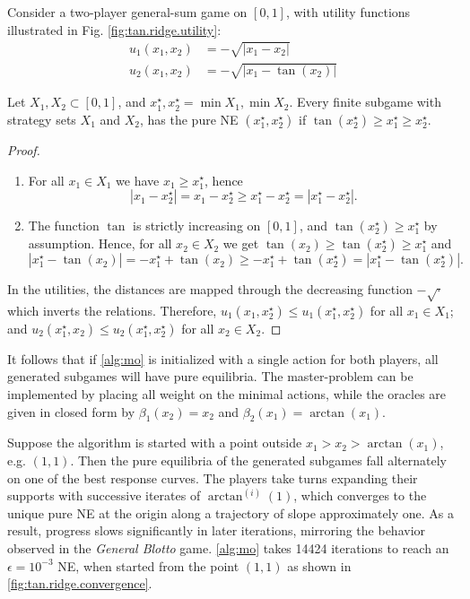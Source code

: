 


\begin{example}\label{ex.tan.ridge}
Consider a two-player general-sum game on $[0,1]$, with utility functions illustrated in Fig. \ref{fig:tan.ridge.utility}:
\[\begin{aligned}
u_1(x_1,x_2)&=-\sqrt{|x_1-x_2|} \\
u_2(x_1,x_2)&=-\sqrt{|x_1-\tan(x_2)|}
\end{aligned}\]

Let $X_1,X_2\subset[0,1]$, and $x^\star_1,x^\star_2 = \min X_1, \min X_2$. Every finite subgame with strategy sets $X_1$ and $X_2$, has the pure NE $(x^\star_1, x^\star_2)$ if $\tan(x^\star_2) \ge  x^\star_1 \ge x^\star_2$.
\begin{proof}
\begin{enumerate}
    \item For all $x_1\in X_1$ we have $x_1\ge x^\star_1$, hence
    \[
    |x_1-x^\star_2|=x_1-x^\star_2\ge x^\star_1-x^\star_2=|x^\star_1-x^\star_2|.
    \]
    \item The function $\tan$ is strictly increasing on $[0,1]$, and $\tan(x^\star_2)\ge x^\star_1$ by assumption. Hence, for all $x_2 \in X_2$ we get $\tan(x_2)\ge\tan(x^\star_2)\ge x^\star_1$ and
    \[
    |x^\star_1-\tan(x_2)|=-x^\star_1+\tan(x_2) \ge -x^\star_1 + \tan(x^\star_2)=|x^\star_1-\tan(x^\star_2)|.
    \]
\end{enumerate}

In the utilities, the distances are mapped through the decreasing function $-\sqrt{\cdot}$ which inverts the relations. Therefore, $u_1(x_1,x^\star_2) \le u_1(x^\star_1,x^\star_2)$ for all $x_1\in X_1$; and $u_2(x^\star_1,x_2) \le u_2(x^\star_1,x^\star_2)$ for all $x_2\in X_2$.
\end{proof}

It follows that if \ref{alg:mo} is initialized with a single action for both players, all generated subgames will have pure equilibria. The master-problem can be implemented by placing all weight on the minimal actions, while the oracles are given in closed form by $\beta_1(x_2) = x_2$ and $\beta_2(x_1)=\arctan(x_1)$.

Suppose the algorithm is started with a point outside $x_1 > x_2 > \arctan(x_1)$, e.g. $(1,1)$. Then the pure equilibria of the generated subgames fall alternately on one of the best response curves. The players take turns expanding their supports with successive iterates of $\arctan^{(i)}(1)$, which converges to the unique pure NE at the origin along a trajectory of slope approximately one. As a result, progress slows significantly in later iterations, mirroring the behavior observed in the \emph{General Blotto} game. \cref{alg:mo} takes 14424 iterations to reach an $\epsilon=10^{-3}$ NE, when started from the point $(1,1)$ as shown in \cref{fig:tan.ridge.convergence}.


\end{example}

